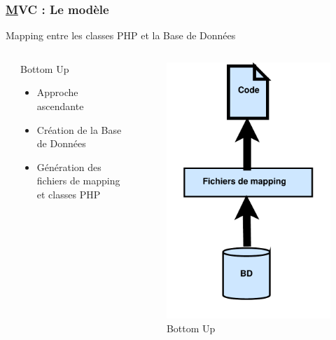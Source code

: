 \begin{frame}
	\frametitle{\underline{M}VC : Le modèle}
	\begin{block}{Mapping entre les classes PHP et la Base de Données}	
		\begin{columns}
			\begin{column}{0.9cm}
			\end{column}
			\begin{column}{6cm}
				\begin{Large}Bottom Up\end{Large}
				\begin{itemize}
					\item Approche ascendante
					\item Création de la Base de Données
					\item Génération des fichiers de mapping et classes PHP
				\end{itemize}
			\end{column}
			
			\begin{column}{4cm}
			\begin{figure}[!h]
				\begin{center}
					\includegraphics[scale=0.225]{images/bottomUp}
					\caption{Bottom Up}
				\end{center}
			\end{figure}
		\end{column}
	

\end{columns}
\end{block}
\end{frame}
